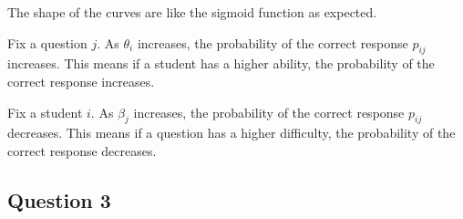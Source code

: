 \documentclass{article}
\begin{document}
\begin{enumerate}[label=(\alph*)]
    The shape of the curves are like the sigmoid function as expected.
    
    Fix a question $j$. As $\theta_i$ increases, the probability of the correct response $p_{ij}$ increases. This means if a student has a higher ability, the probability of the correct response increases.

    Fix a student $i$. As $\beta_j$ increases, the probability of the correct response $p_{ij}$ decreases. This means if a question has a higher difficulty, the probability of the correct response decreases.
\end{enumerate}

\newpage

\subsection*{Question 3}
\end{document}
